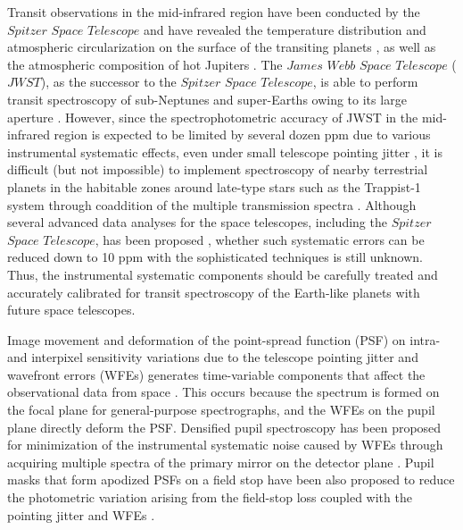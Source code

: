\documentclass{aastex62}
\begin{document}
Transit observations in the mid-infrared region have been conducted by the $Spitzer$ $Space$ $Telescope$ and have revealed the temperature distribution and atmospheric circularization on the surface of the transiting planets \citep[e.g.,][]{2007Natur.447..183K, 2014Sci...346..838S, 2016ApJ...821....9K}, as well as the atmospheric composition of hot Jupiters \citep[e.g.,][]{2007Natur.448..169T, 2009ApJ...707...24M}. The $James$ $Webb$ $Space$ $Telescope$ ($JWST$), as the successor to the $Spitzer$ $Space$ $Telescope$, is able to perform transit spectroscopy of sub-Neptunes and super-Earths owing to its large aperture \citep[e.g.,][]{2009PASP..121..952D, 2016ApJ...817...17G}. However, since the spectrophotometric accuracy of JWST in the mid-infrared region is expected to be limited by several dozen ppm due to various instrumental systematic effects, even under small telescope pointing jitter \citep{2014PASP..126.1134B}, it is difficult (but not impossible) to implement spectroscopy of nearby terrestrial planets in the habitable zones around late-type stars such as the Trappist-1 system \citep{2017Natur.542..456G} through coaddition of the multiple transmission spectra \citep{2018arXiv180303730B}. Although several advanced data analyses for the space telescopes, including the $Spitzer$ $Space$ $Telescope$, has been proposed \citep[e.g.,][]{2013ApJ...766....7W, 2016ApJ...820...86M}, whether such systematic errors can be reduced down to 10 ppm with the sophisticated techniques is still unknown. Thus, the instrumental systematic components should be carefully treated and accurately calibrated for transit spectroscopy of the Earth-like planets with future space telescopes.

Image movement and deformation of the point-spread function (PSF) on intra- and interpixel sensitivity variations \citep{2007PASP..119..466B, 2012SPIE.8442E..1YI} due to the telescope pointing jitter and wavefront errors (WFEs) generates time-variable components that affect the observational data from space \citep{2014ASPC..485..407C, 2014ApJ...790...53Z}. This occurs because the spectrum is formed on the focal plane for general-purpose spectrographs, and the WFEs on the pupil plane directly deform the PSF. Densified pupil spectroscopy has been proposed for minimization of the instrumental systematic noise caused by WFEs through acquiring multiple spectra of the primary mirror on the detector plane \citep{2016ApJ...823..139M}. Pupil masks that form apodized PSFs on a field stop have been also proposed to reduce the photometric variation arising from the field-stop loss coupled with the pointing jitter and WFEs \citep{2017AJ....154...97I}.
\end{document}

